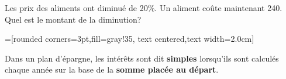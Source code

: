 \documentclass[main.tex]{subfiles}
\begin{document}
\begin{exercise}\hfill 
	 
\noindent\parbox{0.70\linewidth}{
	Les prix des aliments ont diminué de 20\%. Un aliment coûte maintenant 240. Quel est le montant de la diminution? 
}\parbox{0.23\linewidth}{
	=[rounded corners=3pt,fill=gray!35, text centered,text width=2.0cm]
}
\end{exercise}
 
 \begin{eBox}
 	Dans un plan d'épargne, les intérêts sont dit \textbf{simples} lorsqu'ils sont calculés chaque année sur la base de la \textbf{somme placée au départ}. 
 \end{eBox}   
 
\end{document}

